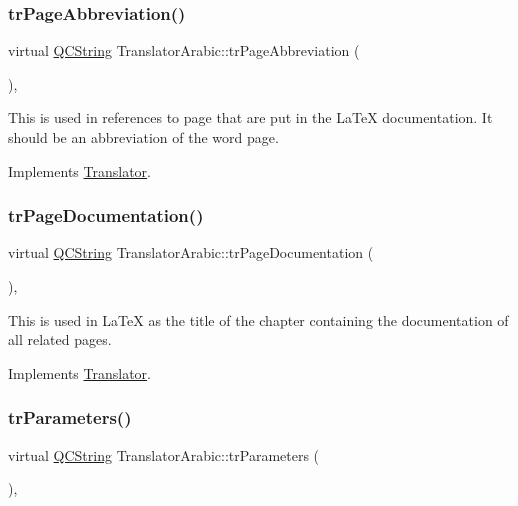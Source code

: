 \subsubsection{\texorpdfstring{trPageAbbreviation()}{trPageAbbreviation()}}
{\footnotesize\ttfamily virtual \mbox{\hyperlink{class_q_c_string}{Q\+C\+String}} Translator\+Arabic\+::tr\+Page\+Abbreviation (\begin{DoxyParamCaption}{ }\end{DoxyParamCaption})\hspace{0.3cm}{\ttfamily [inline]}, {\ttfamily [virtual]}}

This is used in references to page that are put in the La\+TeX documentation. It should be an abbreviation of the word page. 

Implements \mbox{\hyperlink{class_translator}{Translator}}.

\mbox{\label{class_translator_arabic_a074729639b28138464929fa6232672bf}} 
\subsubsection{\texorpdfstring{trPageDocumentation()}{trPageDocumentation()}}
{\footnotesize\ttfamily virtual \mbox{\hyperlink{class_q_c_string}{Q\+C\+String}} Translator\+Arabic\+::tr\+Page\+Documentation (\begin{DoxyParamCaption}{ }\end{DoxyParamCaption})\hspace{0.3cm}{\ttfamily [inline]}, {\ttfamily [virtual]}}

This is used in La\+TeX as the title of the chapter containing the documentation of all related pages. 

Implements \mbox{\hyperlink{class_translator}{Translator}}.

\mbox{\label{class_translator_arabic_a3c12052d296a5979c62e84f4fa372169}} 
\subsubsection{\texorpdfstring{trParameters()}{trParameters()}}
{\footnotesize\ttfamily virtual \mbox{\hyperlink{class_q_c_string}{Q\+C\+String}} Translator\+Arabic\+::tr\+Parameters (\begin{DoxyParamCaption}{ }\end{DoxyParamCaption})\hspace{0.3cm}{\ttfamily [inline]}, {\ttfamily [virtual]}}

